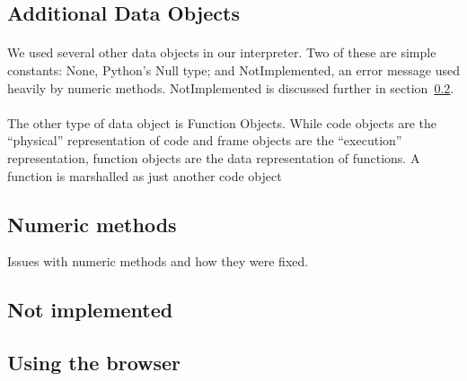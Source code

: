\documentclass{article}
\begin{document}
\subsection{Additional Data Objects}

\paragraph{}
We used several other data objects in our interpreter. Two of these are simple constants: None, Python's Null type; and NotImplemented, an error message used heavily by numeric methods. NotImplemented is discussed further in section~\ref{numeric}.

\paragraph{}
The other type of data object is Function Objects. While code objects are the ``physical'' representation of code and frame objects are the ``execution'' representation, function objects are the data representation of functions. A function is marshalled as just another code object


\subsection{Numeric methods} \label{numeric}

Issues with numeric methods and how they were fixed.

\subsection{Not implemented}

\subsection{Using the browser}



%
%

\end{document}
